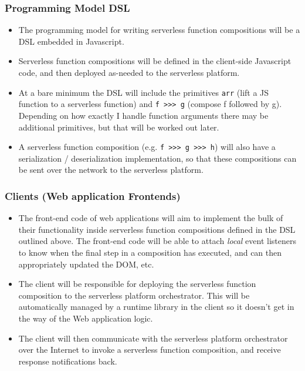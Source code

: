 \documentclass[12pt]{article}
\begin{document}
\subsubsection{Programming Model DSL}
\begin{itemize}
  \item The programming model for writing 
  serverless function compositions will be a DSL embedded
  in Javascript. 
  \item Serverless function compositions will be
  defined in the client-side Javascript code, and then
  deployed as-needed to the serverless platform.
  \item At a bare minimum the DSL will include the primitives
  \texttt{arr} (lift a JS function to a serverless function) 
  and \texttt{f >>> g} (compose f followed by g). Depending on
  how exactly I handle function arguments there may be additional
  primitives, but that will be worked out later.
  \item A serverless function composition (e.g. \texttt{f >>> g >>> h})
  will also have a serialization / deserialization implementation,
  so that these compositions can be sent over the network to the 
  serverless platform.
\end{itemize}

\subsubsection{Clients (Web application Frontends)}
\begin{itemize}
  \item The front-end code of web applications will aim
  to implement the bulk of their functionality inside
  serverless function compositions defined in the DSL outlined
  above. The front-end code will be able to attach \emph{local}
  event listeners to know when the final step in a composition
  has executed, and can then appropriately updated the DOM, etc.
  \item The client will be responsible for deploying
  the serverless function composition to the serverless platform 
  orchestrator.
  This will be automatically managed by a runtime library in the
  client so it doesn't get in the way of the Web application logic.
  \item The client will then communicate with the serverless
  platform orchestrator over the Internet to invoke a serverless function
  composition, and receive response notifications back.
\end{itemize}
\end{document}
